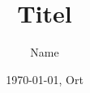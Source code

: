 \usepackage[utf8x]{inputenc}
\usepackage[ngerman]{babel}
\usepackage{graphicx}
\usepackage{lmodern}
\usepackage{hyperref}

\hypersetup{
	colorlinks =truerue,
	linktoc =all,
	linkcolor=red,
}

\title{Titel}
\author{Name}
\date{\today, Ort}
